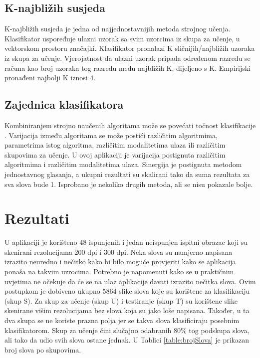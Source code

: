 \documentclass[a4paper,twocolumn,dvipdfm]{article}
\begin{document}
\subsection{K-najbližih susjeda}
K-najbližih susjeda je jedna od najjednostavnijih metoda strojnog učenja. 
Klasifikator uspoređuje ulazni uzorak sa svim uzorcima iz skupa za učenje, 
u vektorskom prostoru značajki. Klasifikator pronalazi K sličnijih/najbližih 
uzoraka iz skupa za učenje. Vjerojatnost da ulazni uzorak pripada određenom 
razredu se računa kao broj uzoraka tog razredu među najbližih K, dijeljeno s K. 
Empirijski pronađeni najbolji K iznosi 4.

\subsection{Zajednica klasifikatora}
Kombiniranjem strojno naučenih algoritama može se povećati točnost
klasifikacije \cite{alpaydin2004introduction}. Varijacija između algoritama se
može postići različitim algoritmima, parametrima istog algoritma, različitim
modalitetima ulaza ili različitim skupovima za učenje. U ovoj aplikaciji je
varijacija postignuta različitim algoritmima i različitim modalitetima ulaza.
Sinergija je postignuta metodom jednostavnog glasanja, a ukupni rezultati su
skalirani tako da suma rezultata za sva slova bude 1. Isprobano je nekoliko
drugih metoda, ali se nisu pokazale bolje.

\section{Rezultati}
U aplikaciji je korišteno 48 ispunjenih i jedan neispunjen ispitni obrazac koji
su skenirani rezolucijama 200 dpi i 300 dpi. Neka slova su namjerno napisana
izrazito neuredno i nečitko kako bi bilo moguće provjeriti kako se aplikacija
ponaša na takvim uzrocima. Potrebno je napomenuti kako se u praktičnim uvjetima
ne očekuje da će se na ulaz aplikacije davati izrazito nečitka slova. Ovim
postupkom je dobiveno ukupno 5864 slike slova koje su korištene za klasifikaciju
(skup S). Za skup za učenje (skup U) i testiranje (skup T) su korištene slike
skenirane višim rezolucijama bez slova koja su jako loše napisana. Također,
u ta dva skupa se ne koriste prazna polja jer se takva slova klasificiraju
posebnim klasifikatorom. Skup za učenje čini slučajno odabranih 80\% tog
podskupa slova, ali tako da udio svih slova ostane jednak. U Tablici
\ref{table:brojSlova} je prikazan broj slova po skupovima.
\end{document}
